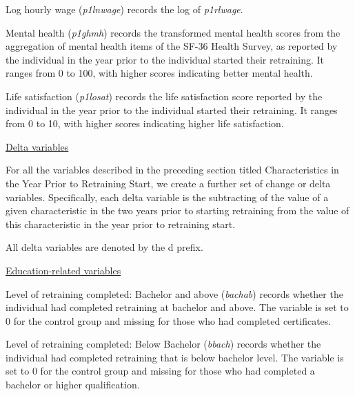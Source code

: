 \documentclass[12pt, a4paper]{article}
\begin{document}
Log hourly wage (\textit{p1\textunderscore{}lnwage}) records the log of  \textit{p1\textunderscore{}rlwage}. 

Mental health (\textit{p1\textunderscore{}ghmh}) records the transformed mental health scores from the aggregation of mental health items of the SF-36 Health Survey, as reported by the individual in the year prior to the individual started their retraining. It ranges from 0 to 100, with higher scores indicating better mental health.   

Life satisfaction (\textit{p1\textunderscore{}losat}) records the life satisfaction score reported by the individual in the year prior to the individual started their retraining. It ranges from 0 to 10, with higher scores indicating higher life satisfaction. 

\underline{Delta variables}

For all the variables described in the preceding section titled Characteristics in the Year Prior to Retraining Start, we create a further set of change or delta variables. Specifically, each delta variable is the subtracting of the value of a given characteristic in the two years prior to starting retraining from the value of this characteristic in the year prior to retraining start. 

All delta variables are denoted by the d\textunderscore{} prefix. 

\underline{Education-related variables}

Level of retraining completed: Bachelor and above (\textit{bachab}) records whether the individual had completed retraining at bachelor and above. The variable is set to 0 for the control group and missing for those who had completed certificates. 

Level of retraining completed: Below Bachelor (\textit{bbach}) records whether the individual had completed retraining that is below bachelor level. The variable is set to 0 for the control group and missing for those who had completed a bachelor or higher qualification. 
\end{document}
